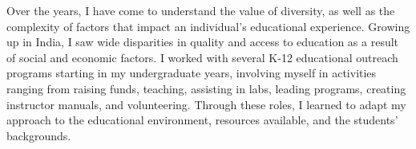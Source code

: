 \documentclass[10pt]{article}
\begin{document}
Over the years, I have come to understand the value of diversity, as well as the complexity of factors that impact an individual's educational experience.   
Growing up in India, %
I saw wide disparities in quality and access to education as a result of social and economic factors. %
I worked with several K-12 educational outreach programs starting in my undergraduate years, involving myself in activities ranging from raising funds, teaching, assisting in labs, leading programs, creating instructor manuals, and volunteering. %
Through these roles, I learned to adapt my approach to the educational environment, resources available, and the students' backgrounds. %
\end{document}
